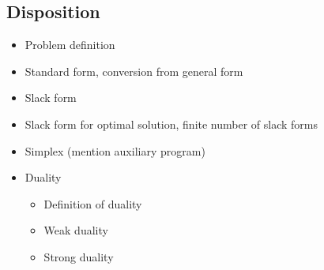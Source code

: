 \subsection{Disposition}
\begin{itemize}
\item Problem definition
\item Standard form, conversion from general form
\item Slack form
\item Slack form for optimal solution, finite number of slack forms
\item Simplex (mention auxiliary program)
\item Duality
  \begin{itemize}
  \item Definition of duality
  \item Weak duality
  \item Strong duality
  \end{itemize}
\end{itemize}

